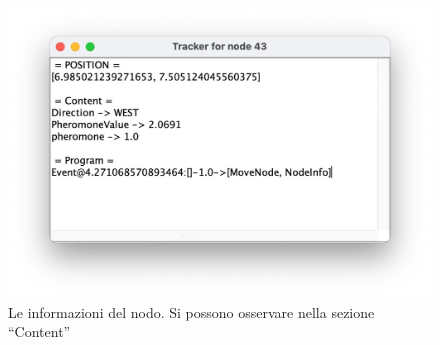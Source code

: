 \begin{figure}[ht]
    \centering
    \includegraphics[width=.7\linewidth]{figures/nodeinfo.jpg}
    \caption{Le informazioni del nodo. Si possono osservare nella sezione ``Content''}\label{fig:nodeinfo}
\end{figure}
\clearpage

